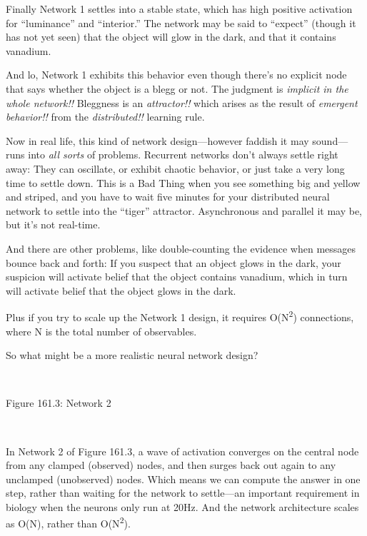 {
 Finally Network 1 settles into a stable state, which has high
positive activation for
``luminance'' and
``interior.'' The network may be
said to ``expect'' (though it has
not yet seen) that the object will glow in the dark, and that it
contains vanadium.}

{
 And lo, Network 1 exhibits this behavior even though
there's no explicit node that says whether the object
is a blegg or not. The judgment is \textit{implicit in the whole
network!!} Bleggness is an \textit{attractor!!} which arises as the
result of \textit{emergent behavior!!} from the \textit{distributed!!}
learning rule.}

{
 Now in real life, this kind of network design---however faddish it
may sound---runs into \textit{all sorts} of problems. Recurrent
networks don't always settle right away: They can
oscillate, or exhibit chaotic behavior, or just take a very long time
to settle down. This is a Bad Thing when you see something big and
yellow and striped, and you have to wait five minutes for your
distributed neural network to settle into the
``tiger'' attractor. Asynchronous
and parallel it may be, but it's not real-time.}

{
 And there are other problems, like double-counting the evidence
when messages bounce back and forth: If you suspect that an object
glows in the dark, your suspicion will activate belief that the object
contains vanadium, which in turn will activate belief that the object
glows in the dark.}

{
 Plus if you try to scale up the Network 1 design, it requires
O(N\textsuperscript{2}) connections, where N is the total number of
observables.}

{
 So what might be a more realistic neural network design?}

{
 ~}

{\centering
{}
 \newline
 Figure 161.3: Network 2
\par}


\bigskip

{
 ~}

{
 In Network 2 of Figure 161.3, a wave of activation converges on
the central node from any clamped (observed) nodes, and then surges
back out again to any unclamped (unobserved) nodes. Which means we can
compute the answer in one step, rather than waiting for the network to
settle---an important requirement in biology when the neurons only run
at 20Hz. And the network architecture scales as O(N), rather than
O(N\textsuperscript{2}).}

